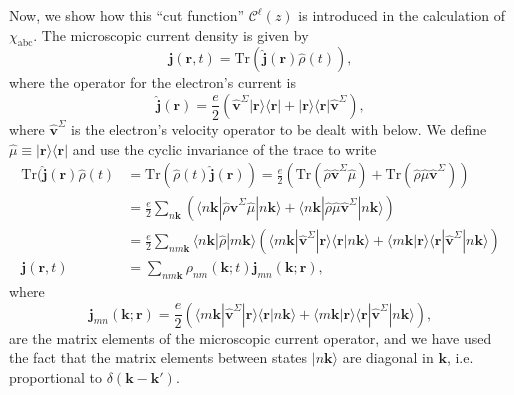 Now, we show how this ``cut function'' $\mathcal{C}^{\ell}(z)$ is introduced in
the calculation of $\chi_{\mathrm{abc}}$. 
The microscopic current density is given by
\begin{equation}\label{jmic}
\mathbf{j}(\mathbf{r},t)=\mathrm{Tr}(\hat{\mathbf{j}}(\mathbf{r})\hat{\rho}(t)),
\end{equation}
where the operator for the electron's current is
\begin{equation}\label{hatjmic}
\hat{\mathbf{j}}(\mathbf{r})=\frac{e}{2}\left(\hat{\mathbf{v}}^{\Sigma} |\mathbf{r}\rangle\langle\mathbf{r}|
+ |\mathbf{r}\rangle\langle\mathbf{r}|\hat{\mathbf{v}}^{\Sigma}\right), 
\end{equation}
where $\hat{\mathbf{v}}^{\Sigma}$ is the electron's velocity operator to be dealt
with below. We define
$\hat{\mu} \equiv |\mathbf{r}\rangle\langle\mathbf{r}|$ and use the cyclic invariance of
the trace to write
\begin{align}\label{jmic2}
\mathrm{Tr}(\hat{\mathbf{j}}(\mathbf{r})\hat{\rho}(t)
&= \mathrm{Tr}(\hat{\rho}(t)\hat{\mathbf{j}}(\mathbf{r}))
= \frac{e}{2}
\left(
  \mathrm{Tr}(\hat{\rho}\hat{\mathbf{v}}^{\Sigma}\hat{\mu})
+ \mathrm{Tr}(\hat{\rho}\hat{\mu}\hat{\mathbf{v}}^{\Sigma})
\right)\nonumber\\
&= \frac{e}{2}\sum_{n\mathbf{k}}
\left(
\langle n\mathbf{k}| \hat{\rho}\hat{\mathbf{v}}^{\Sigma}\hat{\mu} |n\mathbf{k}\rangle
+ \langle n\mathbf{k}| \hat{\rho}\hat{\mu}\hat{\mathbf{v}}^{\Sigma} |n\mathbf{k}\rangle
\right)\nonumber\\
&= \frac{e}{2}\sum_{nm\mathbf{k}}\langle n\mathbf{k}|\hat{\rho} |m\mathbf{k}\rangle
\left(
\langle m\mathbf{k}| \hat{\mathbf{v}}^{\Sigma}|\mathbf{r}\rangle \langle\mathbf{r}|n\mathbf{k}\rangle
+ \langle m\mathbf{k}|\mathbf{r}\rangle \langle\mathbf{r}| \hat{\mathbf{v}}^{\Sigma} |n\mathbf{k}\rangle
\right)
\nonumber\\
\mathbf{j}(\mathbf{r},t)
&= \sum_{nm\mathbf{k}}\rho_{nm}(\mathbf{k};t)\mathbf{j}_{mn}(\mathbf{k};\mathbf{r}),
\end{align}
where
\begin{equation}\label{jmic3}
\mathbf{j}_{mn}(\mathbf{k};\mathbf{r})=
\frac{e}{2}
\left(
\langle m\mathbf{k}| \hat{\mathbf{v}}^{\Sigma} |\mathbf{r}\rangle \langle\mathbf{r}|n\mathbf{k}\rangle
+
\langle m\mathbf{k}|\mathbf{r}\rangle \langle\mathbf{r}| \hat{\mathbf{v}}^{\Sigma} |n\mathbf{k}\rangle
\right),
\end{equation}
are the matrix elements of the microscopic current operator,
and we have used the fact that the matrix elements between states $|n\mathbf{k}\rangle$
are diagonal in $\mathbf{k}$, i.e. proportional to $\delta(\mathbf{k}-\mathbf{k}')$.

